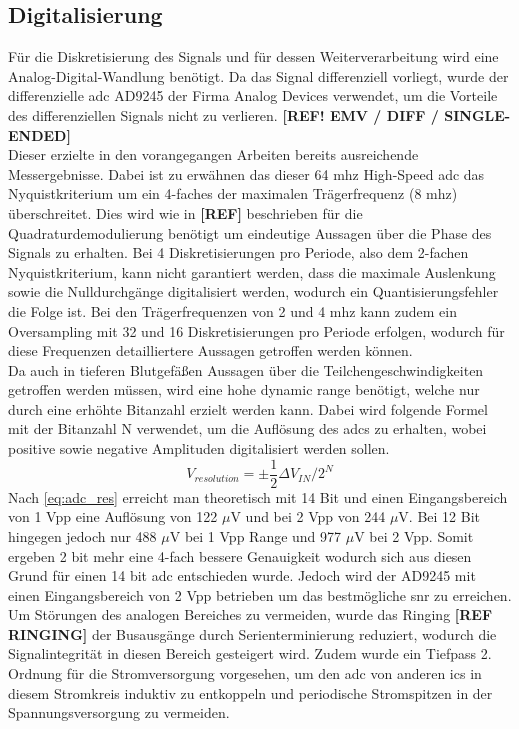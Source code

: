\subsection{Digitalisierung}
Für die Diskretisierung des Signals und für dessen Weiterverarbeitung wird eine Analog-Digital-Wandlung benötigt. Da das Signal differenziell vorliegt, wurde der differenzielle \ac{adc} AD9245 der Firma Analog Devices verwendet, um die Vorteile des differenziellen Signals nicht zu verlieren.\cite{ad9245} \textbf{[REF! EMV / DIFF / SINGLE-ENDED]}\\
Dieser erzielte in den vorangegangen Arbeiten bereits ausreichende Messergebnisse. Dabei ist zu erwähnen das dieser 64 \ac{mhz} High-Speed \ac{adc} das Nyquistkriterium um ein 4-faches der maximalen Trägerfrequenz (8 \ac{mhz}) überschreitet. Dies wird wie in \textbf{[REF]} beschrieben für die Quadraturdemodulierung benötigt um eindeutige Aussagen über die Phase des Signals zu erhalten. Bei 4 Diskretisierungen pro Periode, also dem 2-fachen Nyquistkriterium, kann nicht garantiert werden, dass die maximale Auslenkung sowie die Nulldurchgänge digitalisiert werden, wodurch ein Quantisierungsfehler die Folge ist. Bei den Trägerfrequenzen von 2 und 4 \ac{mhz} kann zudem ein Oversampling mit 32 und 16 Diskretisierungen pro Periode erfolgen, wodurch für diese Frequenzen detailliertere Aussagen getroffen werden können.\\
Da auch in tieferen Blutgefäßen Aussagen über die Teilchengeschwindigkeiten getroffen werden müssen, wird eine hohe dynamic range benötigt, welche nur durch eine erhöhte Bitanzahl erzielt werden kann. Dabei wird folgende Formel mit der Bitanzahl N verwendet, um die Auflösung des \ac{adc}s zu erhalten, wobei positive sowie negative Amplituden digitalisiert werden sollen.\cite[p. 59]{lattice_adc}
\begin{equation}
V_{resolution} =\pm\frac{1}{2}\Delta V_{IN}/2^{N}\label{eq:adc_res}
\end{equation}
Nach \autoref{eq:adc_res} erreicht man theoretisch mit 14 Bit und einen Eingangsbereich von 1 Vpp eine Auflösung von 122 $\mu$V und bei 2 Vpp von 244 $\mu$V. Bei 12 Bit hingegen jedoch nur 488 $\mu$V bei 1 Vpp Range und 977 $\mu$V bei 2 Vpp. Somit ergeben 2 bit mehr eine 4-fach bessere Genauigkeit wodurch sich aus diesen Grund für einen 14 bit \ac{adc} entschieden wurde. Jedoch wird der AD9245 mit einen Eingangsbereich von 2 Vpp betrieben um das bestmögliche \ac{snr} zu erreichen.\cite[p. 18]{ad9245}\\
Um Störungen des analogen Bereiches zu vermeiden, wurde das Ringing \textbf{[REF RINGING]} der Busausgänge durch Serienterminierung reduziert, wodurch die Signalintegrität in diesen Bereich gesteigert wird. Zudem wurde ein Tiefpass 2. Ordnung für die Stromversorgung vorgesehen, um den \ac{adc} von anderen \ac{ic}s in diesem Stromkreis induktiv zu entkoppeln und periodische Stromspitzen in der Spannungsversorgung zu vermeiden.
%
%
%
